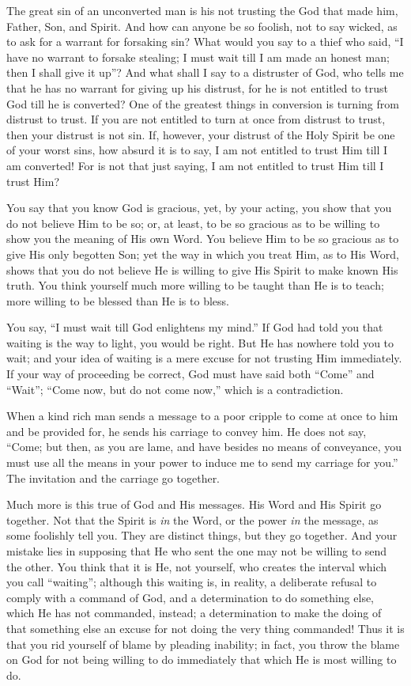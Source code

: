 \documentclass[
]{book}
\begin{document}
The great sin of an unconverted man is his not trusting the God that made him, Father, Son, and Spirit. And how can anyone be so foolish, not to say wicked, as to ask for a warrant for forsaking sin? What would you say to a thief who said, ``I have no warrant to forsake stealing; I must wait till I am made an honest man; then I shall give it up''? And what shall I say to a distruster of God, who tells me that he has no warrant for giving up his distrust, for he is not entitled to trust God till he is converted? One of the greatest things in conversion is turning from distrust to trust. If you are not entitled to turn at once from distrust to trust, then your distrust is not sin. If, however, your distrust of the Holy Spirit be one of your worst sins, how absurd it is to say, I am not entitled to trust Him till I am converted! For is not that just saying, I am not entitled to trust Him till I trust Him?

You say that you know God is gracious, yet, by your acting, you show that you do not believe Him to be so; or, at least, to be so gracious as to be willing to show you the meaning of His own Word. You believe Him to be so gracious as to give His only begotten Son; yet the way in which you treat Him, as to His Word, shows that you do not believe He is willing to give His Spirit to make known His truth. You think yourself much more willing to be taught than He is to teach; more willing to be blessed than He is to bless.

You say, ``I must wait till God enlightens my mind.'' If God had told you that waiting is the way to light, you would be right. But He has nowhere told you to wait; and your idea of waiting is a mere excuse for not trusting Him immediately. If your way of proceeding be correct, God must have said both ``Come'' and ``Wait''; ``Come now, but do not come now,'' which is a contradiction.

When a kind rich man sends a message to a poor cripple to come at once to him and be provided for, he sends his carriage to convey him. He does not say, ``Come; but then, as you are lame, and have besides no means of conveyance, you must use all the means in your power to induce me to send my carriage for you.'' The invitation and the carriage go together.

Much more is this true of God and His messages. His Word and His Spirit go together. Not that the Spirit is \emph{in} the Word, or the power \emph{in} the message, as some foolishly tell you. They are distinct things, but they go together. And your mistake lies in supposing that He who sent the one may not be willing to send the other. You think that it is He, not yourself, who creates the interval which you call ``waiting''; although this waiting is, in reality, a deliberate refusal to comply with a command of God, and a determination to do something else, which He has not commanded, instead; a determination to make the doing of that something else an excuse for not doing the very thing commanded! Thus it is that you rid yourself of blame by pleading inability; in fact, you throw the blame on God for not being willing to do immediately that which He is most willing to do.
\end{document}

